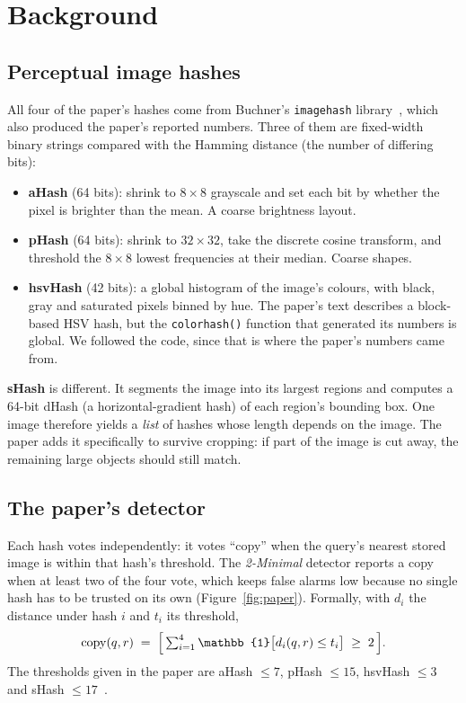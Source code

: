 \section{Background}

\subsection{Perceptual image hashes}

All four of the paper's hashes come from Buchner's \texttt{imagehash} library~\cite{imagehash},
which also produced the paper's reported numbers. Three of them are fixed-width binary
strings compared with the Hamming distance (the number of differing bits):
\begin{itemize}
  \item \textbf{aHash} (64 bits): shrink to $8\times8$ grayscale and set each bit by whether
        the pixel is brighter than the mean. A coarse brightness layout.
  \item \textbf{pHash} (64 bits): shrink to $32\times32$, take the discrete cosine transform,
        and threshold the $8\times8$ lowest frequencies at their median. Coarse shapes.
  \item \textbf{hsvHash} (42 bits): a global histogram of the image's colours, with black, gray
        and saturated pixels binned by hue. The paper's text describes a block-based HSV hash, but the
        \texttt{colorhash()} function that generated its numbers is global. We followed the
        code, since that is where the paper's numbers came from.
\end{itemize}

\textbf{sHash} is different. It segments the image into its largest regions and computes a
64-bit dHash (a horizontal-gradient hash) of each region's bounding box. One image therefore
yields a \emph{list} of hashes whose length depends on the image. The paper adds it
specifically to survive cropping: if part of the image is cut away, the remaining large
objects should still match.

\subsection{The paper's detector}

Each hash votes independently: it votes ``copy'' when the query's nearest stored image is
within that hash's threshold. The \emph{2-Minimal} detector reports a copy when at least two
of the four vote, which keeps false alarms low because no single hash has to be trusted on
its own (Figure~\ref{fig:paper}). Formally, with $d_i$ the distance under hash $i$ and
$t_i$ its threshold,
\[
  \mathrm{copy}(q,r) \;=\; \Bigl[\, \textstyle\sum_{i=1}^{4} \mathbb{1}\bigl[d_i(q,r)\le t_i\bigr] \;\ge\; 2 \,\Bigr].
\]
The thresholds given in the paper are aHash $\le 7$, pHash $\le 15$, hsvHash $\le 3$ and sHash
$\le 17$~\cite{kotzer2025}.

